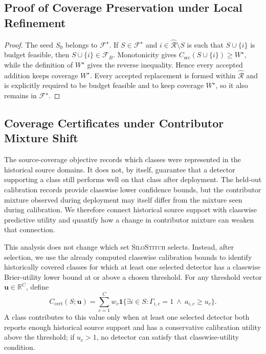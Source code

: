 \documentclass[conference]{IEEEtran}
\theoremstyle{definition}
\newcommand{\Fname}{\textsc{SiloStitch}\xspace}
\begin{document}
\subsection{Proof of Coverage Preservation under Local Refinement}
\label{app:proof_refinement}
\begin{proof}
The seed $S_0$ belongs to $\mathcal F^\star$. If $S\in\mathcal F^\star$ and $i\in\widehat{\mathcal R}\setminus S$ is such that $S\cup\{i\}$ is budget feasible, then $S\cup\{i\}\in\mathcal F_B$. Monotonicity gives $C_{\mathrm{src}}(S\cup\{i\})\ge W^\star$, while the definition of $W^\star$ gives the reverse inequality. Hence every accepted addition keeps coverage $W^\star$. Every accepted replacement is formed within $\widehat{\mathcal R}$ and is explicitly required to be budget feasible and to keep coverage $W^\star$, so it also remains in $\mathcal F^\star$.
\end{proof}

\subsection{Coverage Certificates under Contributor Mixture Shift}
\label{app:mixture_shift}

The source-coverage objective records which classes were represented in the historical source domains.
It does not, by itself, guarantee that a detector supporting a class still performs well on that class after deployment.
The held-out calibration records provide classwise lower confidence bounds, but the contributor mixture observed during deployment may itself differ from the mixture seen during calibration.
We therefore connect historical source support with classwise predictive utility and quantify how a change in contributor mixture can weaken that connection.

This analysis does not change which set \Fname selects.
Instead, after selection, we use the already computed classwise calibration bounds to identify historically covered classes for which at least one selected detector has a classwise Brier-utility lower bound at or above a chosen threshold.
For any threshold vector $\boldsymbol u\in\mathbb R^C$, define
\begin{equation}
C_{\mathrm{cert}}(S;\boldsymbol u)=
\sum_{c=1}^{C}w_c
\mathbf 1\{\exists i\in S:
\Gamma_{i,c}=1\ \wedge\ a_{i,c}\ge u_c\}.
\label{eq:certified_coverage}
\end{equation}
A class contributes to this value only when at least one selected detector both reports enough historical source support and has a conservative calibration utility above the threshold; if $u_c>1$, no detector can satisfy that classwise-utility condition.
\end{document}

